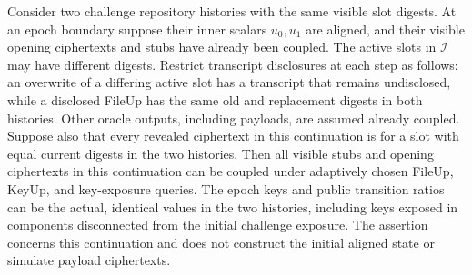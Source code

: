\begin{lemma}
\label{lem:opening-continuation}
Consider two challenge repository histories with the same visible slot digests. At an epoch boundary suppose their inner scalars $u_0,u_1$ are aligned, and their visible opening ciphertexts and stubs have already been coupled. The active slots in $\mathcal I$ may have different digests. Restrict transcript disclosures at each step as follows: an overwrite of a differing active slot has a transcript that remains undisclosed, while a disclosed FileUp has the same old and replacement digests in both histories. Other oracle outputs, including payloads, are assumed already coupled. Suppose also that every revealed ciphertext in this continuation is for a slot with equal current digests in the two histories. Then all visible stubs and opening ciphertexts in this continuation can be coupled under adaptively chosen FileUp, KeyUp, and key-exposure queries. The epoch keys and public transition ratios can be the actual, identical values in the two histories, including keys exposed in components disconnected from the initial challenge exposure. The assertion concerns this continuation and does not construct the initial aligned state or simulate payload ciphertexts.
\end{lemma}
